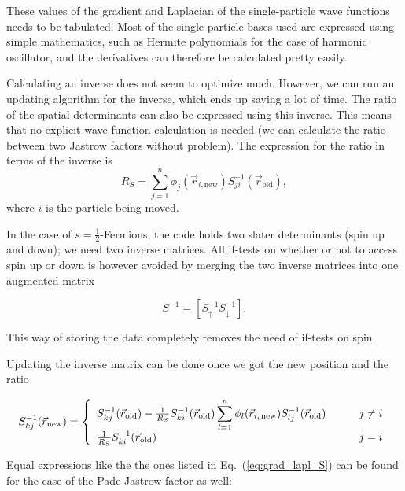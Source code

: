 These values of the gradient and Laplacian of the single-particle wave functions needs to be tabulated. Most of the single particle bases used are expressed using simple mathematics, such as Hermite polynomials for the case of harmonic oscillator, and the derivatives can therefore be calculated pretty easily. 

Calculating an inverse does not seem to optimize much. However, we can run an updating algorithm for the inverse, which ends up saving a lot of time. The ratio of the spatial determinants can also be expressed using this inverse\cite{larseivind}. This means that no explicit wave function calculation is needed (we can calculate the ratio between two Jastrow factors without problem). The expression for the ratio in terms of the inverse is
\begin{equation}
 R_S = \displaystyle\sum_{j=1}^n \phi_j({\vec r}_{i,\mathrm{new}})S^{-1}_{ji}(\vec r_\mathrm{old}),
\label{eq:Ratio}
\end{equation}
where $i$ is the particle being moved.

In the case of $s=\frac{1}{2}$-Fermions, the code holds two slater determinants (spin up and down); we need two inverse matrices. All if-tests on whether or not to access spin up or down is however avoided by merging the two inverse matrices into one augmented matrix

\[
 S^{-1} = \left[S^{-1}_\uparrow S^{-1}_\downarrow\right].
\]

\noindent
This way of storing the data completely removes the need of if-tests on spin.

Updating the inverse matrix can be done once we got the new position and the ratio

\begin{eqnarray}
 S^{-1}_{kj}(\vec r_\mathrm{new})  = \left\{ 
\begin{array}{l l}
  S^{-1}_{kj}(\vec r_\mathrm{old}) - \frac{1}{R_S}S^{-1}_{ki}(\vec r_\mathrm{old})\displaystyle\sum_{l=1}^{n} \phi_{l}(\vec r_{i,\,\mathrm{new}})  S^{-1}_{lj}(\vec r_\mathrm{old}) &\qquad \mbox{$j \neq i$} \\
 \frac{1}{R_S}S^{-1}_{ki}(\vec r_\mathrm{old})  &\qquad \mbox{$j=i$}
\end{array} \right.
\label{eq:Update_inv}
\end{eqnarray}


Equal expressions like the the ones listed in Eq.~(\ref{eq:grad_lapl_S}) can be found for the case of the Pade-Jastrow factor as well:

